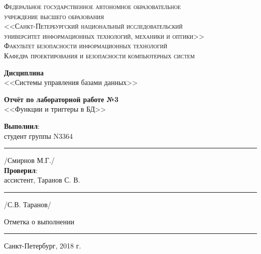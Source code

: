 \begin{titlepage}
	\begin{center}
		\textsc{
			\fontsize{12pt}{14pt}\selectfont
			Федеральное государственное автономное образовательное\\
			учреждение высшего образования\\
			<<Санкт-Петербургский национальный исследовательский\\
			университет информационных технологий, механики и оптики>>\\
			Факультет безопасности информационных технологий\\
			Кафедра проектирования и безопасности компьютерных систем\\}
		
		\vfill
		
		\textbf{Дисциплина}\\
		<<Системы управления базами данных>>\\
		
		\vfill
		
		\textbf{Отчёт по лабораторной работе №3}\\
		<<Функции и триггеры в БД>>\\

	\end{center}

	\vfill
	
	\begin{flushright}
	\textbf{Выполнил}: \\
	студент группы N3364\\
	\rule{10em}{.1pt} /Смирнов М.Г./\\
	\vfill
	\textbf{Проверил}:\\
	ассистент, Таранов С. В.\\

	\rule{10em}{.1pt} /С.В. Таранов/\\
	
	\vfill
	
	Отметка о выполнении \rule{10em}{.1pt}
	
	
		


	\end{flushright}
	\vfill
	\begin{center}
		Санкт-Петербург, 2018 г.
	\end{center}
\end{titlepage}